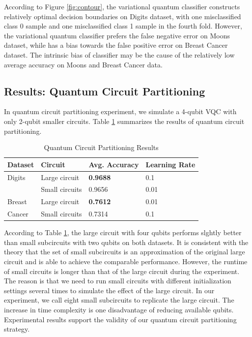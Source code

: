 \documentclass[sigconf]{acmart}
\begin{document}
According to Figure \ref{fig:contour}, the variational quantum classifier constructs relatively optimal decision boundaries on Digits dataset, with one misclassified class 0 sample and one misclassified class 1 sample in the fourth fold. However, the variational quantum classifier prefers the false negative error on Moons dataset, while has a bias towards the false positive error on Breast Cancer dataset. The intrinsic bias of classifier may be the cause of the relatively low average accuracy on Moons and Breast Cancer data.

\subsection{Results: Quantum Circuit Partitioning}
In quantum circuit partitioning experiment, we simulate a 4-qubit VQC with only 2-qubit smaller circuits. Table \ref{tab:qcp-results} summarizes the results of quantum circuit partitioning.

\begin{table}[!ht]
    \centering
    \caption{Quantum Circuit Partitioning Results}
    \label{tab:qcp-results}
    \begin{tabular}{llll}
       \toprule 
       \textbf{Dataset} & \textbf{Circuit} & \textbf{Avg. Accuracy} & \textbf{Learning Rate}\\
       \midrule
       Digits & Large circuit & \textbf{0.9688} & 0.1\\
              & Small circuits &  0.9656 & 0.01\\
       Breast & Large circuit & \textbf{0.7612} & 0.01\\
       Cancer & Small circuits & 0.7314 & 0.1\\
       \bottomrule
    \end{tabular}
\end{table}

According to Table \ref{tab:qcp-results}, the large circuit with four qubits performs slghtly better than small subcircuits with two qubits on both datasets. It is consistent with the theory that the set of small subcircuits is an approximation of the original large circuit and is able to achieve the comparable performance. However, the runtime of small circuits is longer than that of the large circuit during the experiment. The reason is that we need to run small circuits with different initialization settings several times to simulate the effect of the large circuit. In our experiment, we call eight small subcircuits to replicate the large circuit. The increase in time complexity is one disadvantage of reducing available qubits. Experimental results support the validity of our quantum circuit partitioning strategy.
\end{document}
